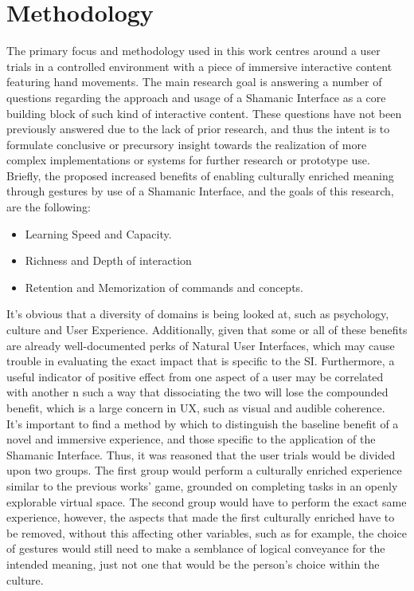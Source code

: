 \section{Methodology} \label{sec:develop_methodology}
    The primary focus and methodology used in this work centres around a user trials in a controlled environment with a piece of immersive interactive content featuring hand movements. The main research goal is answering a number of questions regarding the approach and usage of a Shamanic Interface as a core building block of such kind of interactive content. These questions have not been previously answered due to the lack of prior research, and thus the intent is to formulate conclusive or precursory insight towards the realization of more complex implementations or systems for further research or prototype use.\\
    Briefly, the proposed increased benefits of enabling culturally enriched meaning through gestures by use of a Shamanic Interface, and the goals of this research, are the following: 
    \begin{itemize}
        \item Learning Speed and Capacity.
        \item Richness and Depth of interaction
        \item Retention and Memorization of commands and concepts.
    \end{itemize}
    It’s obvious that a diversity of domains is being looked at, such as psychology, culture and User Experience. Additionally, given that some or all of these benefits are already well-documented perks of Natural User Interfaces, which may cause trouble in evaluating the exact impact that is specific to the SI. Furthermore, a useful indicator of positive effect from one aspect of a user may be correlated with another n such a way that dissociating the two will lose the compounded benefit, which is a large concern in UX, such as visual and audible coherence.\\
    It’s important to find a method by which to distinguish the baseline benefit of a novel and immersive experience, and those specific to the application of the Shamanic Interface. Thus, it was reasoned that the user trials would be divided upon two groups. The first group would perform a culturally enriched experience similar to the previous works’ game, grounded on completing tasks in an openly explorable virtual space.  The second group would have to perform the exact same experience, however, the aspects that made the first culturally enriched have to be removed, without this affecting other variables, such as for example, the choice of gestures would still need to make a semblance of logical conveyance for the intended meaning, just not one that would be the person’s choice within the culture.\\

